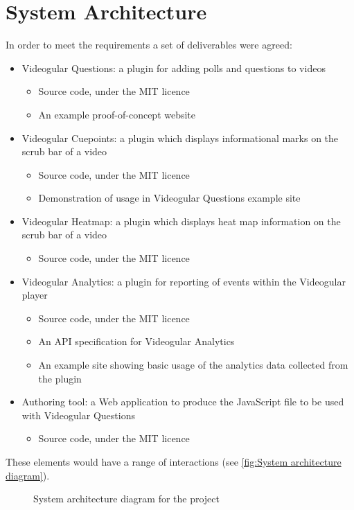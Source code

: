 \section{System Architecture}
In order to meet the requirements a set of deliverables were agreed:
\begin{itemize}
\item Videogular Questions: a plugin for adding polls and questions to videos
\begin{itemize}
\item Source code, under the MIT licence
\item An example proof-of-concept website
\end{itemize}
\item Videogular Cuepoints: a plugin which displays informational marks on the scrub bar of a video
\begin{itemize}
\item Source code, under the MIT licence
\item Demonstration of usage in Videogular Questions example site
\end{itemize}
\item Videogular Heatmap: a plugin which displays heat map information on the scrub bar of a video
\begin{itemize}
\item Source code, under the MIT licence
\end{itemize}
\item Videogular Analytics: a plugin for reporting of events within the Videogular player
\begin{itemize}
\item Source code, under the MIT licence
\item An API specification for Videogular Analytics
\item An example site showing basic usage of the analytics data collected from the plugin
\end{itemize}
\item Authoring tool: a Web application to produce the JavaScript file to be used with Videogular Questions
\begin{itemize}
\item Source code, under the MIT licence
\end{itemize}
\end{itemize}

These elements would have a range of interactions (see \autoref{fig:System architecture diagram}).

\begin{figure}[h!]
\centering

\caption{System architecture diagram for the project \label{fig:System architecture diagram}}
\end{figure}

